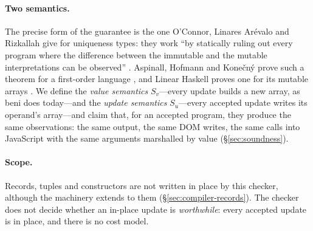 \paragraph{Two semantics.} The precise form of the guarantee is the one O'Connor, Linares
Ar\'evalo and Rizkallah give for uniqueness types: they work ``by statically ruling out every
program where the difference between the immutable and the mutable interpretations can be
observed'' \citep{oconnor2026separation}. Aspinall, Hofmann and Kone\v{c}n\'y prove such a theorem
for a first-order language \citep[Thm.~5.8]{aspinall2008usage}, and Linear Haskell proves one for
its mutable arrays \citep{bernardy2018linear}. We define the \emph{value semantics} $S_v$---every
update builds a new array, as beni does today---and the \emph{update semantics} $S_u$---every
accepted update writes its operand's array---and claim that, for an accepted program, they produce
the same observations: the same output, the same DOM writes, the same calls into JavaScript with the
same arguments marshalled by value (\S\ref{sec:soundness}).

\paragraph{Scope.} Records, tuples and constructors are not written in place by this checker,
although the machinery extends to them (\S\ref{sec:compiler-records}). The checker does not decide
whether an in-place update is \emph{worthwhile}: every accepted update is in place, and there is no
cost model.
